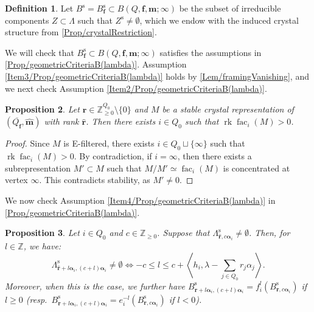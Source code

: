 \documentclass[a4paper,12pt]{article}
\theoremstyle{definition}
\newtheorem{definition}{Definition}[section]
\theoremstyle{plain}
\newtheorem{proposition}[definition]{Proposition}
\theoremstyle{remark}
\DeclareMathOperator{\fac}{fac}
\DeclareMathOperator{\rk}{rk}
\newcommand{\st}{\mathrm{s}}
\newcommand\bbZ{\mathbb{Z}}
\newcommand\bfalpha{\bm{\alpha}}
\newcommand\bff{\mathbf{f}}
\newcommand\bfm{\mathbf{m}}
\newcommand\bfr{\mathbf{r}}
\begin{document}
\begin{definition}\label{def/geometricCrystalB(lambda)}
Let $B^\st=B_\bff^\st\subset B(Q,\bff,\bfm;\infty)$ be the subset of irreducible components $Z\subset\Lambda$ such that $Z^\st\ne\emptyset$, which we endow with the induced crystal structure from \cref{Prop/crystalRestriction}.
\end{definition}

We will check that $B_\bff^\st\subset B(Q,\bff,\bfm;\infty)$ satisfies the assumptions in \cref{Prop/geometricCriteriaB(lambda)}. Assumption \ref{Item3/Prop/geometricCriteriaB(lambda)} holds by \cref{Lem/framingVanishing}, and we next check Assumption \ref{Item2/Prop/geometricCriteriaB(lambda)}.

\begin{proposition}\label{Prop/cokernelsStableRep}
Let $\bfr\in\bbZ_{\geq0}^{Q_0}\setminus\{0\}$ and $M$ be a stable crystal representation of $(\overline{Q_\bff},\widehat{\bfm})$ with rank $\widehat{\bfr}$. Then there exists $i\in Q_0$ such that $\rk \fac_i(M)>0$.
\end{proposition}

\begin{proof}
Since $M$ is E-filtered, there exists $i\in Q_0\sqcup\{\infty\}$ such that $\rk \fac_i(M)>0$. By contradiction, if $i=\infty$, then there exists a subrepresentation $M'\subset M$ such that $M/M'\simeq \fac_i(M)$ is concentrated at vertex $\infty$. This contradicts stability, as $M'\ne0$.
\end{proof}

We now check Assumption \ref{Item4/Prop/geometricCriteriaB(lambda)} in \cref{Prop/geometricCriteriaB(lambda)}.

\begin{proposition}\label{Prop/crystalOperatorRange}
Let $i\in Q_0$ and $c\in\bbZ_{\geq0}$. Suppose that $\Lambda_{\widehat{\bfr},c\bfalpha_i}^\st\ne\emptyset$. Then, for $l\in\bbZ$, we have:
\[
\Lambda_{\widehat{\bfr}+l\bfalpha_i,(c+l)\bfalpha_i}^\st\ne\emptyset
\Leftrightarrow
-c\leq l\leq c+\left\langle h_i,\lambda-\sum_{j\in Q_0}r_j\alpha_j\right\rangle
.
\]
Moreover, when this is the case, we further have $B_{\bfr+l\bfalpha_i,(c+l)\bfalpha_i}^\st=f_i^l(B_{\bfr,c\bfalpha_i}^\st)$ if $l\geq0$ (resp.\ $B_{\bfr+l\bfalpha_i,(c+l)\bfalpha_i}^\st=e_i^{-l}(B_{\bfr,c\bfalpha_i}^\st)$ if $l<0$).
\end{proposition}
\end{document}
